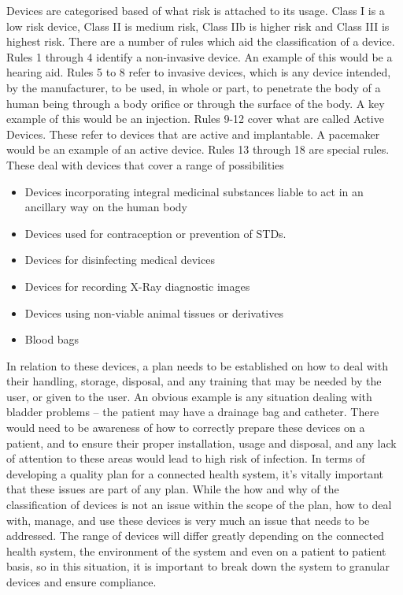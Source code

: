 Devices are categorised based of what risk is attached to its usage. Class I is a low risk device, Class II is medium risk, Class IIb is higher risk and Class III is highest risk. There are a number of rules which aid the classification of a device. Rules 1 through 4 identify a non-invasive device. An example of this would be a hearing aid. Rules 5 to 8 refer to invasive devices, which is any device intended, by the manufacturer, to be used, in whole or part, to penetrate the body of a human being through a body orifice or through the surface of the body. A key example of this would be an injection. Rules 9-12 cover what are called Active Devices. These refer to devices that are active and implantable. A pacemaker would be an example of an active device. Rules 13 through 18 are special rules. These deal with devices that cover a range of possibilities

\begin{itemize}
\item Devices incorporating integral medicinal substances liable to act in an ancillary way on the human body
\item Devices used for contraception or prevention of STDs.
\item Devices for disinfecting medical devices
\item Devices for recording X-Ray diagnostic images
\item Devices using non-viable animal tissues or derivatives
\item Blood bags
\end{itemize}

In relation to these devices, a plan needs to be established on how to deal with their handling, storage, disposal, and any training that may be needed by the user, or given to the user. An obvious example is any situation dealing with bladder problems – the patient may have a drainage bag and catheter. There would need to be awareness of how to correctly prepare these devices on a patient, and to ensure their proper installation, usage and disposal, and any lack of attention to these areas would lead to high risk of infection. In terms of developing a quality plan for a connected health system, it’s vitally important that these issues are part of any plan. While the how and why of the classification of devices is not an issue within the scope of the plan, how to deal with, manage, and use these devices is very much an issue that needs to be addressed. The range of devices will differ greatly depending on the connected health system, the environment of the system and even on a patient to patient basis, so in this situation, it is important to break down the system to granular devices and ensure compliance.

